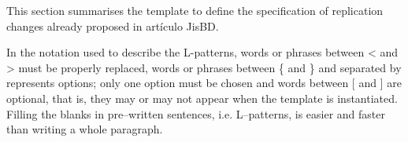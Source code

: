 This section summarises the template to define the specification of replication changes already proposed in \cite{cruz2018} \textcolor[rgb]{1,0,0}{artículo JisBD}. 

In the notation used to describe the L-patterns, words or phrases between \textless \hspace{0.5 mm} and \textgreater \hspace{1 mm} must be properly replaced, words or phrases between \{ and \} and separated by \textbar \hspace{1 mm} represents options; only one option must be chosen and words between [ and ]  are optional, that is, they may or may not appear when the template is instantiated. Filling the blanks in pre–written sentences, i.e. L–patterns, is easier and faster than writing a whole paragraph. 
%


